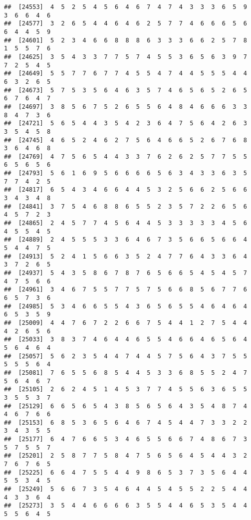 \documentclass[
]{book}
\begin{document}
\begin{verbatim}
##  [24553]  4  5  2  5  4  5  6  4  6  7  4  7  4  3  3  3  6  5  9  3  6  6  4  6
##  [24577]  3  2  6  5  4  4  6  4  6  2  5  7  7  4  6  6  6  5  6  6  4  4  5  9
##  [24601]  5  2  3  4  6  6  8  8  8  6  3  3  3  6  6  2  5  7  8  1  5  5  7  6
##  [24625]  3  5  4  3  3  7  7  5  7  4  5  5  3  6  5  6  3  9  7  7  2  5  4  5
##  [24649]  5  5  7  7  6  7  7  4  5  5  4  7  4  4  5  5  5  4  4  6  3  2  6  5
##  [24673]  5  7  5  3  5  6  4  6  3  5  7  4  6  5  6  5  2  6  5  6  7  6  4  7
##  [24697]  3  8  5  6  7  5  2  6  5  5  6  4  8  4  6  6  6  3  3  8  4  7  3  6
##  [24721]  5  6  5  4  4  3  5  4  2  3  6  4  7  5  6  4  2  6  3  3  5  4  5  8
##  [24745]  4  6  5  2  4  6  2  7  5  6  4  6  6  5  2  6  7  6  8  3  6  4  6  8
##  [24769]  4  7  5  6  5  4  4  3  3  7  6  2  6  2  5  7  7  5  5  6  5  6  5  6
##  [24793]  5  6  1  6  9  5  6  6  6  6  5  6  3  4  3  3  6  3  5  7  7  4  2  5
##  [24817]  6  5  4  3  4  6  6  4  4  5  3  2  5  6  6  2  5  6  6  3  4  3  4  8
##  [24841]  3  7  5  4  6  8  8  6  5  5  2  3  5  7  2  2  6  5  6  4  5  7  2  3
##  [24865]  2  4  5  7  7  4  5  6  4  4  5  3  3  3  3  3  4  5  6  4  5  5  4  5
##  [24889]  2  4  5  5  5  3  3  6  4  6  7  3  5  6  6  5  6  6  4  5  4  4  7  5
##  [24913]  5  2  4  1  5  6  6  3  5  2  4  7  7  6  4  3  3  6  4  3  7  2  6  5
##  [24937]  5  4  3  5  8  6  7  8  7  6  5  6  6  5  4  5  4  5  7  4  7  5  6  6
##  [24961]  3  4  6  7  5  5  7  7  5  7  5  6  6  8  5  6  7  7  6  6  5  7  3  6
##  [24985]  5  3  4  6  6  5  5  4  3  6  5  6  5  5  4  6  4  6  4  6  5  3  5  9
##  [25009]  4  4  7  6  7  2  2  6  6  7  5  4  4  1  2  7  5  4  4  4  2  6  5  6
##  [25033]  3  8  3  7  4  6  4  4  6  5  5  4  6  6  4  6  5  6  4  5  6  4  6  4
##  [25057]  5  6  2  3  5  4  4  7  4  4  5  7  5  6  4  3  7  5  5  5  5  5  6  4
##  [25081]  7  6  5  5  6  8  5  4  4  5  3  3  6  8  5  5  2  4  7  5  6  4  6  7
##  [25105]  2  6  2  4  5  1  4  5  3  7  7  4  5  5  6  3  6  5  5  3  5  5  3  7
##  [25129]  6  6  5  6  5  4  3  8  5  6  5  6  4  3  5  4  8  7  4  4  6  7  6  6
##  [25153]  6  8  5  3  6  5  6  4  6  7  4  5  4  4  7  3  3  2  2  3  4  3  5  5
##  [25177]  6  4  7  6  6  5  3  4  6  5  5  6  6  7  4  8  6  7  3  5  7  5  5  7
##  [25201]  2  5  8  7  7  5  8  4  7  5  6  5  6  4  5  4  4  3  2  7  6  7  6  5
##  [25225]  6  6  4  7  5  5  4  4  9  8  6  5  3  7  3  5  6  4  4  5  5  3  4  5
##  [25249]  5  6  6  7  3  5  4  6  4  4  5  4  5  5  2  2  5  4  4  4  3  3  6  4
##  [25273]  3  5  4  4  6  6  6  6  3  5  5  4  4  6  5  3  5  4  4  5  5  6  4  5

\end{verbatim}
\end{document}
